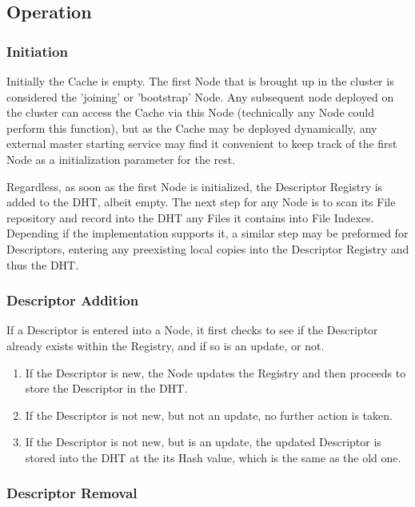 \documentclass[letterpaper,11pt]{article}
\begin{document}
\subsection{Operation}

\subsubsection{Initiation}

Initially the Cache is empty. The first Node that is brought up in the cluster is considered the 'joining' or 'bootstrap' Node. Any subsequent node deployed on the cluster can access the Cache via this  Node (technically any Node could perform this function), but as the Cache may be deployed dynamically, any external master starting service may find it convenient to keep track of the first Node as a initialization parameter for the rest.

Regardless, as soon as the first Node is initialized, the Descriptor Registry is added to the DHT, albeit empty. The next step for any Node is to scan its File repository and record into the DHT any Files it contains into File Indexes. Depending if the implementation supports it, a similar step may be preformed for Descriptors, entering any preexisting local copies into the Descriptor Registry and thus the DHT.

\subsubsection{Descriptor Addition}

If a Descriptor is entered into a Node, it first checks to see if the Descriptor already exists within the Registry, and if so is an update, or not.

\begin{enumerate}
\item  If the Descriptor is new, the Node updates the Registry and then proceeds to store the Descriptor in the DHT.
\item  If the Descriptor is not new, but not an update, no further action is taken.
\item  If the Descriptor is not new, but is an update, the updated Descriptor is stored into the DHT at the its Hash value, which is the same as the old one.
\end{enumerate}

\subsubsection{Descriptor Removal}
\end{document}
